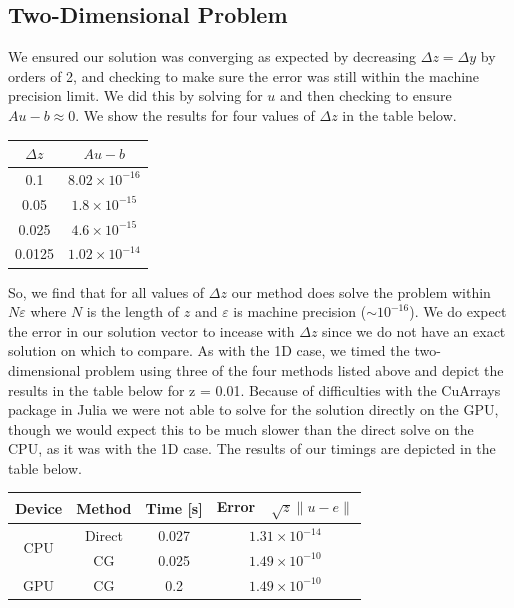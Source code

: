 \documentclass[11pt]{article}
\begin{document}
	\subsection{Two-Dimensional Problem}
	We ensured our solution was converging as expected by decreasing $ \Delta z = \Delta y $ by orders of 2, and checking to make sure the error was still within the machine precision limit. We did this by solving for $ u $ and then checking to ensure $ Au - b \approx 0 $. We show the results for four values of $ \Delta z $ in the table below.
		\begin{center}
		\renewcommand{\arraystretch}{2.0}
		\begin{tabular}{c|c}
			\hline\hline
			$\displaystyle \Delta z $&$\displaystyle Au-b $\\
			\hline
			0.1&$8.02\times 10^{-16}$\\
			0.05&$1.8\times 10^{-15}$\\
			0.025&$4.6\times 10^{-15}$\\
			0.0125&$1.02\times 10^{-14}$\\
			\hline
		\end{tabular}
	\end{center}
	So, we find that for all values of $ \Delta z $ our method does solve the problem within $ N\varepsilon $ where $ N $ is the length of $ z $ and $ \varepsilon $ is machine precision ($ \sim 10^{-16} $). We do expect the error in our solution vector to incease with $ \Delta z $ since we do not have an exact solution on which to compare.
	\newline\indent
	As with the 1D case, we timed the two-dimensional problem using three of the four methods listed above and depict the results in the table below for \Delta z = 0.01. Because of difficulties with the CuArrays package in Julia we were not able to solve for the solution directly on the GPU, though we would expect this to be much slower than the direct solve on the CPU, as it was with the 1D case. The results of our timings are depicted in the table below.
	\begin{center}
		\renewcommand{\arraystretch}{1.5}
		\begin{tabular}{c|c|c|c}
			\hline\hline
			\textbf{Device}&\textbf{Method}&\textbf{Time [s]}&\textbf{Error~~$\sqrt{z}\lVert u-e\rVert $}\\
			\hline
			\multirow{2}{*}{CPU}&Direct&0.027&$1.31\times 10^{-14}$\\
			&CG&0.025&$1.49\times 10^{-10}$\\
			\hline
			GPU&CG&0.2&$1.49\times 10^{-10}$\\
			\hline
		\end{tabular}
	\end{center}
\end{document}

